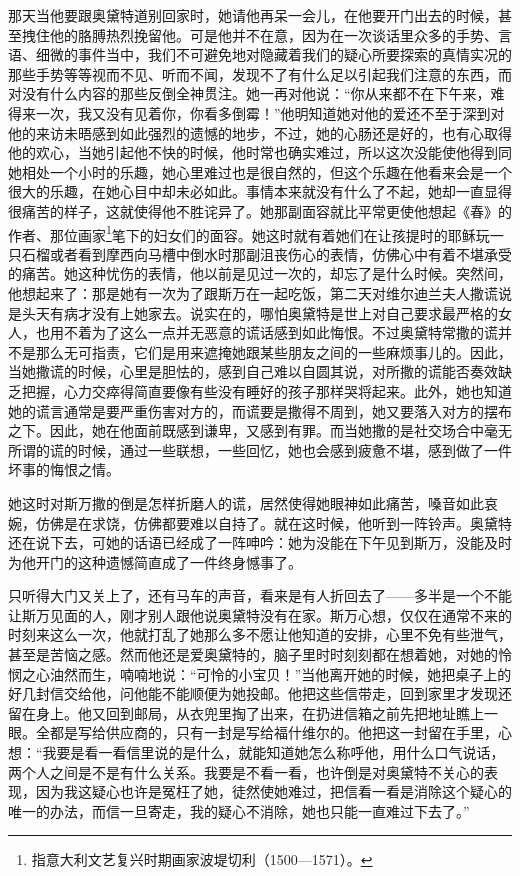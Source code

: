 \par 那天当他要跟奥黛特道别回家时，她请他再呆一会儿，在他要开门出去的时候，甚至拽住他的胳膊热烈挽留他。可是他并不在意，因为在一次谈话里众多的手势、言语、细微的事件当中，我们不可避免地对隐藏着我们的疑心所要探索的真情实况的那些手势等等视而不见、听而不闻，发现不了有什么足以引起我们注意的东西，而对没有什么内容的那些反倒全神贯注。她一再对他说：“你从来都不在下午来，难得来一次，我又没有见着你，你看多倒霉！”他明知道她对他的爱还不至于深到对他的来访未晤感到如此强烈的遗憾的地步，不过，她的心肠还是好的，也有心取得他的欢心，当她引起他不快的时候，他时常也确实难过，所以这次没能使他得到同她相处一个小时的乐趣，她心里难过也是很自然的，但这个乐趣在他看来会是一个很大的乐趣，在她心目中却未必如此。事情本来就没有什么了不起，她却一直显得很痛苦的样子，这就使得他不胜诧异了。她那副面容就比平常更使他想起《春》的作者、那位画家\footnote{指意大利文艺复兴时期画家波堤切利（1500—1571）。}笔下的妇女们的面容。她这时就有着她们在让孩提时的耶稣玩一只石榴或者看到摩西向马槽中倒水时那副沮丧伤心的表情，仿佛心中有着不堪承受的痛苦。她这种忧伤的表情，他以前是见过一次的，却忘了是什么时候。突然间，他想起来了：那是她有一次为了跟斯万在一起吃饭，第二天对维尔迪兰夫人撒谎说是头天有病才没有上她家去。说实在的，哪怕奥黛特是世上对自己要求最严格的女人，也用不着为了这么一点并无恶意的谎话感到如此悔恨。不过奥黛特常撒的谎并不是那么无可指责，它们是用来遮掩她跟某些朋友之间的一些麻烦事儿的。因此，当她撒谎的时候，心里是胆怯的，感到自己难以自圆其说，对所撒的谎能否奏效缺乏把握，心力交瘁得简直要像有些没有睡好的孩子那样哭将起来。此外，她也知道她的谎言通常是要严重伤害对方的，而谎要是撒得不周到，她又要落入对方的摆布之下。因此，她在他面前既感到谦卑，又感到有罪。而当她撒的是社交场合中毫无所谓的谎的时候，通过一些联想，一些回忆，她也会感到疲惫不堪，感到做了一件坏事的悔恨之情。
\par 她这时对斯万撒的倒是怎样折磨人的谎，居然使得她眼神如此痛苦，嗓音如此哀婉，仿佛是在求饶，仿佛都要难以自持了。就在这时候，他听到一阵铃声。奥黛特还在说下去，可她的话语已经成了一阵呻吟：她为没能在下午见到斯万，没能及时为他开门的这种遗憾简直成了一件终身憾事了。
\par 只听得大门又关上了，还有马车的声音，看来是有人折回去了——多半是一个不能让斯万见面的人，刚才别人跟他说奥黛特没有在家。斯万心想，仅仅在通常不来的时刻来这么一次，他就打乱了她那么多不愿让他知道的安排，心里不免有些泄气，甚至是苦恼之感。然而他还是爱奥黛特的，脑子里时时刻刻都在想着她，对她的怜悯之心油然而生，喃喃地说：“可怜的小宝贝！”当他离开她的时候，她把桌子上的好几封信交给他，问他能不能顺便为她投邮。他把这些信带走，回到家里才发现还留在身上。他又回到邮局，从衣兜里掏了出来，在扔进信箱之前先把地址瞧上一眼。全都是写给供应商的，只有一封是写给福什维尔的。他把这一封留在手里，心想：“我要是看一看信里说的是什么，就能知道她怎么称呼他，用什么口气说话，两个人之间是不是有什么关系。我要是不看一看，也许倒是对奥黛特不关心的表现，因为我这疑心也许是冤枉了她，徒然使她难过，把信看一看是消除这个疑心的唯一的办法，而信一旦寄走，我的疑心不消除，她也只能一直难过下去了。”
